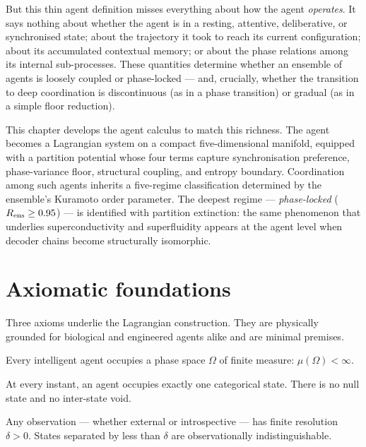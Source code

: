 But this thin agent definition misses everything about how the agent
\emph{operates}. It says nothing about whether the agent is in a resting,
attentive, deliberative, or synchronised state; about the trajectory it took
to reach its current configuration; about its accumulated contextual memory;
or about the phase relations among its internal sub-processes. These
quantities determine whether an ensemble of agents is loosely coupled or
phase-locked --- and, crucially, whether the transition to deep coordination
is discontinuous (as in a phase transition) or gradual (as in a simple
floor reduction).

This chapter develops the agent calculus to match this richness. The agent
becomes a Lagrangian system on a compact five-dimensional manifold, equipped
with a partition potential whose four terms capture synchronisation
preference, phase-variance floor, structural coupling, and entropy boundary.
Coordination among such agents inherits a five-regime classification
determined by the ensemble's Kuramoto order parameter. The deepest regime ---
\emph{phase-locked} ($R_{\mathrm{ens}}\ge 0.95$) --- is identified with partition
extinction: the same phenomenon that underlies superconductivity
\citep{bardeen1957,cooper1956,onnes1911} and superfluidity \citep{landau1941}
appears at the agent level when decoder chains become structurally
isomorphic.

\section{Axiomatic foundations}
\label{sec:ch04-axioms}

Three axioms underlie the Lagrangian construction. They are physically
grounded for biological and engineered agents alike and are minimal
premises.

\begin{axiom}\label{ax:bounded}
Every intelligent agent occupies a phase space $\Omega$ of finite measure:
$\mu(\Omega)<\infty$.
\end{axiom}

\begin{axiom}\label{ax:null}
At every instant, an agent occupies exactly one categorical state. There is
no null state and no inter-state void.
\end{axiom}

\begin{axiom}\label{ax:resolution}
Any observation --- whether external or introspective --- has finite
resolution $\delta>0$. States separated by less than $\delta$ are
observationally indistinguishable.
\end{axiom}

